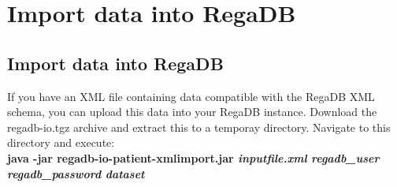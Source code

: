 \chapter{Import data into RegaDB}
\label{chapter:import_data}

\section{Import data into RegaDB}
If you have an XML file containing data compatible with the RegaDB XML schema, you can upload this data into your RegaDB instance.
Download the regadb-io.tgz archive and extract this to a temporay directory. Navigate to this directory and execute: \\
\textbf{java -jar regadb-io-patient-xmlimport.jar \textit{inputfile.xml} \textit{regadb\_user} \textit{regadb\_password} \textit{dataset}}
